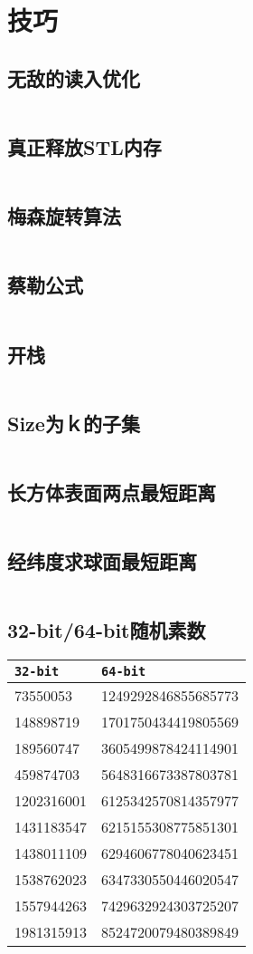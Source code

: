 \chapter{技巧}
\section{无敌的读入优化}
\inputminted{cpp}{\source/hints/input-acceleration.cpp}
\section{真正释放STL内存}
\inputminted{cpp}{\source/hints/STL-memory-release.cpp}
\section{梅森旋转算法}
\inputminted{cpp}{\source/hints/mersenne-twister.cpp}
\section{蔡勒公式}
\inputminted{cpp}{\source/hints/zeller.cpp}
\section{开栈}
\inputminted{cpp}{\source/hints/openstack.cpp}
\section{Size为ｋ的子集}
\inputminted{cpp}{\source/hints/subset-of-size-k.cpp}
\section{长方体表面两点最短距离}
\inputminted{cpp}{\source/hints/长方体表面两点最短距离.cpp}
\section{经纬度求球面最短距离}
\inputminted{cpp}{\source/hints/经纬度求球面最短距离.cpp}
\section{32-bit/64-bit随机素数}
\begin{tabular}{|l|l|}
	\hline
	\texttt{32-bit} & \texttt{64-bit} \\
	\hline
	73550053 & 1249292846855685773 \\
	\hline
	148898719 & 1701750434419805569 \\
	\hline
	189560747 & 3605499878424114901 \\
	\hline
	459874703 & 5648316673387803781 \\
	\hline
	1202316001 & 6125342570814357977 \\
	\hline
	1431183547 & 6215155308775851301 \\
	\hline
	1438011109 & 6294606778040623451 \\
	\hline
	1538762023 & 6347330550446020547 \\
	\hline
	1557944263 & 7429632924303725207 \\
	\hline
	1981315913 & 8524720079480389849 \\
	\hline
\end{tabular}

